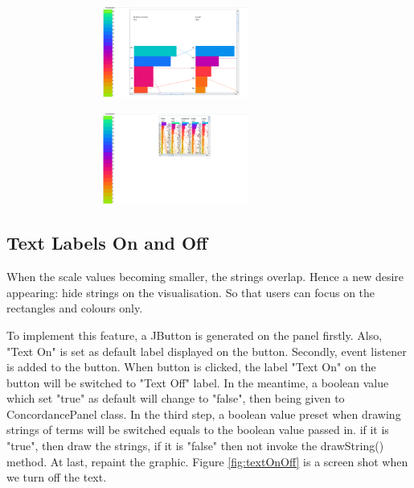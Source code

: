 	\begin{figure}[h]
	\centering	
	\includegraphics[width=9cm, height=3cm]{Figs/Zoom-In}\\[1ex]
	\caption{}
	\label{fig:zoomIn}
	\end{figure}

	\begin{figure}[h]
	\centering	
	\includegraphics[width=9cm, height=3cm]{Figs/Zoom-Out}\\[1ex]
	\caption{}
	\label{fig:zoomOut}
	\end{figure}

\subsection{Text Labels On and Off}

When the scale values becoming smaller, the strings overlap. Hence a new desire appearing: hide strings on the visualisation. So that users can focus on the rectangles and colours only. 

To implement this feature, a JButton is generated on the panel firstly. Also, "Text On" is set as default label displayed on the button. Secondly, event listener is added to the button. When button is clicked, the label "Text On" on the button will be switched to "Text Off" label. In the meantime, a boolean value which set "true" as default will change to "false", then being given to ConcordancePanel class. In the third step, a boolean value preset when drawing strings of terms will be switched equals to the boolean value passed in. if it is "true", then draw the strings, if it is "false" then not invoke the drawString() method. At last, repaint the graphic. Figure \ref{fig:textOnOff} is a screen shot when we turn off the text.

